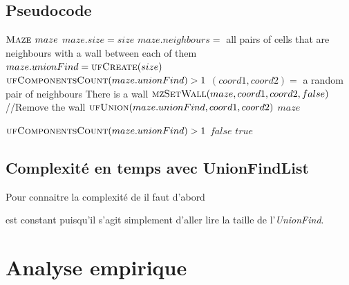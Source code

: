\subsection{Pseudocode} %
\begin{codebox}
\li $\textnormal{\scshape Maze } maze$
\li $maze.size = size$
\li $maze.neighbours =$ all pairs of cells that are neighbours with a wall between each of them
\li $maze.unionFind = \textnormal{\scshape ufCreate}(size)$
\li \While $\textnormal{\scshape ufComponentsCount}(maze.unionFind) > 1$
\Do
\li 	$(coord1, coord2) =$ a random pair of neighbours
\li		\If There is a wall
\li \Then $\textnormal{\scshape mzSetWall}(maze, coord1, coord2, false)$ //Remove the wall
\li	$\textnormal{\scshape ufUnion}(maze.unionFind, coord1, coord2)$
\End
\End
\li \Return $maze$
\End
\end{codebox}

\begin{codebox}
\li \If $\textnormal{\scshape ufComponentsCount}(maze.unionFind) > 1$
\li \Then \Return $false$
\li \Else
\li \Return $true$
\End
\End
\end{codebox}
	
\subsection{Complexité en temps avec UnionFindList} %
Pour connaitre la complexité de  il faut d'abord

 est constant puisqu'il s'agit simplement d'aller lire la taille de l'\textit{UnionFind}.

\section{Analyse empirique}
